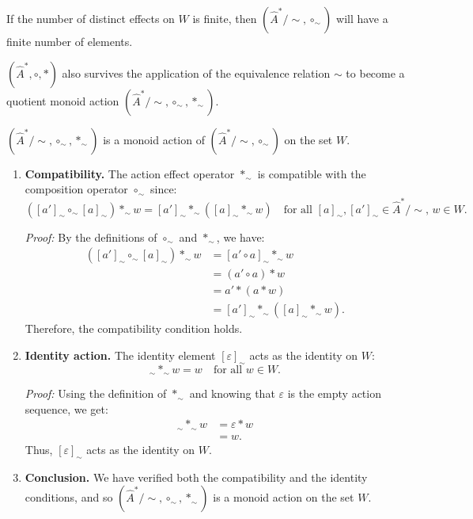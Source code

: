 If the number of distinct effects on $W$ is finite, then $(\hat{A}^{\ast}/\sim, \circ_{\sim})$ will have a finite number of elements.


 $(\hat{A}^{\ast}, \circ, \ast)$ also survives the application of the equivalence relation $\sim$ to become a quotient monoid action $(\hat{A}^{\ast}/\sim, \circ_{\sim}, \ast_{\sim})$.

\begin{propositionE}
    $(\hat{A}^{\ast}/\sim, \circ_{\sim}, \ast_{\sim})$ is a monoid action of $(\hat{A}^{\ast}/\sim, \circ_{\sim})$ on the set $W$.
\end{propositionE}
\begin{proofE}
\begin{enumerate}
    \item \textbf{Compatibility.}
    The action effect operator $\ast_{\sim}$ is compatible with the composition operator $\circ_{\sim}$ since:
    \begin{equation}
        ([a']_{\sim} \circ_{\sim} [a]_{\sim}) \ast_{\sim} w = [a']_{\sim} \ast_{\sim} ([a]_{\sim} \ast_{\sim} w) \quad \text{for all } [a]_{\sim}, [a']_{\sim} \in \hat{A}^{\ast}/\sim, \, w \in W.
    \end{equation}
    
    \textit{Proof:} By the definitions of $\circ_{\sim}$ and $\ast_{\sim}$, we have:
    \begin{align}
        ([a']_{\sim} \circ_{\sim} [a]_{\sim}) \ast_{\sim} w & = [a' \circ a]_{\sim} \ast_{\sim} w                   \\
        & = (a' \circ a) \ast w                                 \\
        & = a' \ast (a \ast w)                                  \\
        & = [a']_{\sim} \ast_{\sim} ([a]_{\sim} \ast_{\sim} w).
    \end{align}
    Therefore, the compatibility condition holds.
    
    \item \textbf{Identity action.}
    The identity element $[\varepsilon]_{\sim}$ acts as the identity on $W$:
    \begin{equation}
        [\varepsilon]_{\sim} \ast_{\sim} w = w \quad \text{for all } w \in W.
    \end{equation}
    
    \textit{Proof:} Using the definition of $\ast_{\sim}$ and knowing that $\varepsilon$ is the empty action sequence, we get:
    \begin{align}
        [\varepsilon]_{\sim} \ast_{\sim} w & = \varepsilon \ast w \\
        & = w.
    \end{align}
    Thus, $[\varepsilon]_{\sim}$ acts as the identity on $W$.
    
    \item \textbf{Conclusion.}
    We have verified both the compatibility and the identity conditions, and so $(\hat{A}^{\ast}/\sim, \circ_{\sim}, \ast_{\sim})$ is a monoid action on the set $W$.
\end{enumerate}
\end{proofE}


